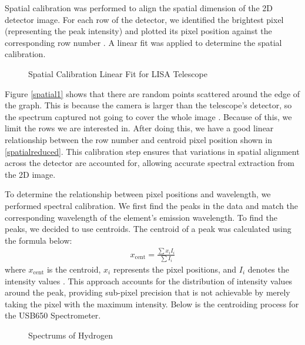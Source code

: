 \documentclass[10pt, preprint]{aastex}
\begin{document}
Spatial calibration was performed to align the spatial dimension of the 2D detector image. For each row of the detector, we identified the brightest pixel (representing the peak intensity) and plotted its pixel position against the corresponding row number \cite{labmanual3}. A linear fit was applied to determine the spatial calibration.

\begin{figure}[H]
  \centering
  \hfill
  \caption{\label{fig:spatial} Spatial Calibration Linear Fit for LISA Telescope }
\end{figure}

Figure \ref{spatial1} shows that there are random points scattered around the edge of the graph. This is because the camera is larger than the telescope's detector, so the spectrum captured not going to cover the whole image \cite{labmanual3}. Because of this, we limit the rows we are interested in. After doing this, we have a good linear relationship between the row number and centroid pixel position shown in \ref{spatialreduced}. This calibration step ensures that variations in spatial alignment across the detector are accounted for, allowing accurate spectral extraction from the 2D image.

To determine the relationship between pixel positions and wavelength, we performed spectral calibration. We first find the peaks in the data and match the corresponding wavelength of the element's emission wavelength. To find the peaks, we decided to use centroids. The centroid of a peak was calculated using the formula below:
\begin{align}
    x_{\text{cent}} = \frac{\sum x_i I_i}{\sum I_i}
\end{align}
where \( x_{\text{cent}} \) is the centroid, \( x_i \) represents the pixel positions, and \( I_i \) denotes the intensity values \cite{centroidingcode}. This approach accounts for the distribution of intensity values around the peak, providing sub-pixel precision that is not achievable by merely taking the pixel with the maximum intensity. Below is the centroiding process for the USB650 Spectrometer. 

\begin{figure}[H]
  \centering
  \hfill
  \caption{\label{fig:hy} Spectrums of Hydrogen}
\end{figure}
\end{document}
